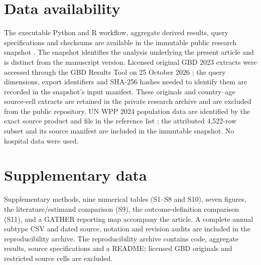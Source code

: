 \documentclass[11pt,a4paper]{article}
\begin{document}
\section*{Data availability}
The executable Python and R workflow, aggregate derived results, query specifications and checksums are available in the immutable public research snapshot \citep{repository}. The snapshot identifies the analysis underlying the present article and is distinct from the manuscript version. Licensed original GBD 2023 extracts were accessed through the GBD Results Tool on 25 October 2026 \citep{results}; the query dimensions, export identifiers and SHA-256 hashes needed to identify them are recorded in the snapshot's input manifest. These originals and country--age source-cell extracts are retained in the private research archive and are excluded from the public repository. UN WPP 2024 population data are identified by the exact source product and file in the reference list \citep{wpp2024}; the attributed 4,522-row subset and its source manifest are included in the immutable snapshot. No hospital data were used.

\section*{Supplementary data}
Supplementary methods, nine numerical tables (S1--S8 and S10), seven figures, the literature/estimand comparison (S9), the outcome-definition comparison (S11), and a GATHER reporting map accompany the article. A complete annual subtype CSV and dated source, notation and revision audits are included in the reproducibility archive. The reproducibility archive contains code, aggregate results, source specifications and a README; licensed GBD originals and restricted source cells are excluded.
\end{document}
